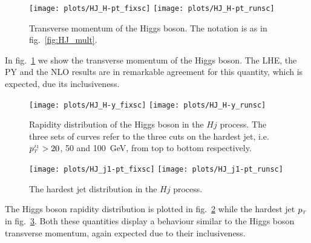 \documentclass[paper]{JHEP3}
\newlength{\hfig}
\newlength{\hfigs}
\newcommand\sss{\mathchoice%
{\displaystyle}%
{\scriptstyle}%
{\scriptscriptstyle}%
{\scriptscriptstyle}%
}
\newcommand\pt{p_{\sss T}}
\begin{document}
\begin{figure}[htb]
\begin{center}
\texttt{[image: plots/HJ\_H-pt\_fixsc]}
\texttt{[image: plots/HJ\_H-pt\_runsc]} 
\caption{Transverse momentum of the Higgs boson.  The notation is as in
  fig.~\ref{fig:HJ_mult}.  }
\label{fig:HJ_h-pt}
\end{center}
\end{figure}
In fig.~\ref{fig:HJ_h-pt} we show the transverse momentum of the Higgs boson.
The LHE, the PY and the NLO results are in remarkable
agreement for this quantity, which is expected, due its inclusiveness.  
\begin{figure}[htb]
\begin{center}
\texttt{[image: plots/HJ\_H-y\_fixsc]}
\texttt{[image: plots/HJ\_H-y\_runsc]} 
\caption{Rapidity distribution of the Higgs boson in the $Hj$ process. The
  three sets of curves refer to the three cuts on the hardest jet,
  i.e.~$\pt^{\sss j_1} > 20$, 50 and 100~GeV, from top to bottom respectively. }
\label{fig:HJ_H-y}
\end{center}
\end{figure}
\begin{figure}[htb]
\begin{center}
\texttt{[image: plots/HJ\_j1-pt\_fixsc]} \nolinebreak
\texttt{[image: plots/HJ\_j1-pt\_runsc]} 
\caption{The hardest jet distribution in the $Hj$ process.}
\label{fig:HJ_j1-pt}
\end{center}
\end{figure}
The Higgs boson rapidity distribution is plotted in fig.~\ref{fig:HJ_H-y}
while the hardest jet $\pt$ in fig.~\ref{fig:HJ_j1-pt}. Both these quantities
display a behaviour similar to the Higgs boson transverse momentum, again
expected due to their inclusiveness.
\end{document}
